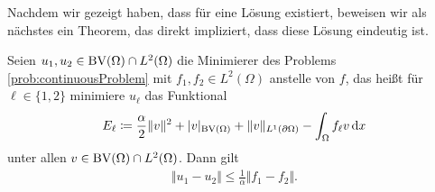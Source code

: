 Nachdem wir gezeigt haben, dass für  eine
Lösung existiert, beweisen wir als nächstes ein Theorem, das direkt impliziert,
dass diese Lösung eindeutig ist. 
\begin{theorem}
  \label{thm:contProbStabAndUniqu}
  Seien $u_1,u_2\in \textup{BV}(\Omega)\cap L^2(\Omega)$ die Minimierer des Problems
  \ref{prob:continuousProblem} mit $f_1,f_2\in L^2(\Omega)$ anstelle von $f$,
  das heißt für $\ell\in\{1,2\}$ minimiere $u_\ell$ das Funktional
  \begin{align*}
    E_\ell
    \coloneqq 
    \frac{\alpha}{2}\Vert v\Vert^2 + |v|_{\textup{BV}(\Omega)} 
    + \Vert v\Vert_{L^1(\partial\Omega)} - \int_\Omega f_\ell v\,\mathrm{d}x
  \end{align*}
  unter allen $v\in\textup{BV}(\Omega)\cap L^2(\Omega)$.
  Dann gilt 
  \begin{align*}
    \Vert u_1 - u_2\Vert 
    \leq\frac{1}{\alpha}\Vert f_1-f_2\Vert.
  \end{align*}
\end{theorem}

